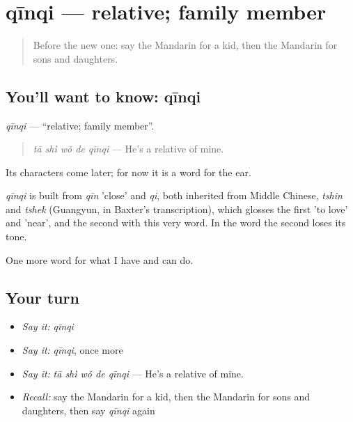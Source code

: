 \section[qīnqi]{qīnqi — relative; family member}

\label{lesson:ZH-C253-qinqi}



\begin{quote}
Before the new one: say the Mandarin for a kid, then the Mandarin for sons and daughters.
\end{quote}

\subsection*{You'll want to know: qīnqi}
\emph{qīnqi} — \textquotedblleft{}relative; family member\textquotedblright{}.

\begin{quote}
\emph{tā shì wǒ de qīnqi} — He's a relative of mine.
\end{quote}

Its characters come later; for now it is a word for the ear.

\begin{cousinweb}
\emph{qīnqi} is built from \emph{qīn} 'close' and \emph{qi}, both inherited from Middle Chinese, \emph{tshin} and \emph{tshek} (Guangyun, in Baxter's transcription), which glosses the first 'to love' and 'near', and the second with this very word. In the word the second loses its tone.
\end{cousinweb}

\begin{grammarlens}[title={What you've built}]
One more word for what I have and can do.
\end{grammarlens}

\subsection*{Your turn}
\begin{itemize}
\raggedright
  \item \emph{Say it:} \emph{qīnqi}
  \item \emph{Say it:} \emph{qīnqi}, once more
  \item \emph{Say it:} \emph{tā shì wǒ de qīnqi} — He's a relative of mine.
  \item \emph{Recall:} say the Mandarin for a kid, then the Mandarin for sons and daughters, then say \emph{qīnqi} again
\end{itemize}

